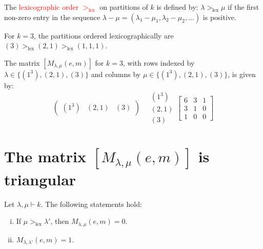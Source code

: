 \documentclass[12pt]{memoir}
\begin{document}
\begin{ptcb}
\begin{Def}
The \textcolor{red}{lexicographic order $>_{\text{lex}}$} on partitions of $k$ is defined by: $\lambda >_{\text{lex}} \mu$ if the first non-zero entry in the sequence $\lambda - \mu = (\lambda_1 - \mu_1, \lambda_2 - \mu_2, \dots)$ is positive.
\end{Def}
\end{ptcb}

For $k = 3$, the partitions ordered lexicographically are $(3) >_{\text{lex}} (2,1) >_{\text{lex}} (1,1,1)$.

The matrix $[M_{\lambda,\mu}(e,m)]$ for $k = 3$, with rows indexed by $\lambda \in \{(1^3), (2,1), (3)\}$ and columns by $\mu \in \{(1^3), (2,1), (3)\}$, is given by:
\[
\begin{pmatrix}
(1^3) & (2,1) & (3)
\end{pmatrix}
\quad
\begin{matrix}
(1^3) \\ (2,1) \\ (3)
\end{matrix}
\begin{bmatrix}
6 & 3 & 1 \\
3 & 1 & 0 \\
1 & 0 & 0
\end{bmatrix}
\]

\newpage

\section{The matrix \texorpdfstring{$[M_{\lambda,\mu}(e,m)]$}{[M\_\{lambda,mu\}(e,m)]} is triangular}

\begin{ptcb}
\begin{Prop}
Let $\lambda, \mu \vdash k$. The following statements hold:
\begin{enumerate}[(i)]
    \item If $\mu >_{\text{lex}} \lambda'$, then $M_{\lambda,\mu}(e,m) = 0$.
    \item $M_{\lambda,\lambda'}(e,m) = 1$.
\end{enumerate}
\end{Prop}
\end{ptcb}
\end{document}
